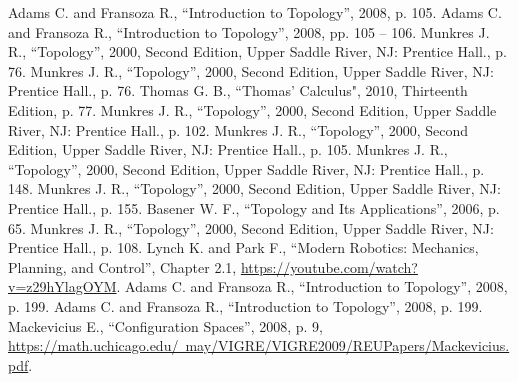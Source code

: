 \documentclass[12pt]{article}
\theoremstyle{definition}
\begin{document}
\begin{center}
\begin{thebibliography}{00}
     Adams C. and Fransoza R., ``Introduction to Topology'', 2008, p. 105.
     Adams C. and Fransoza R., ``Introduction to Topology'', 2008, pp. 105 -- 106.
     Munkres J. R., ``Topology'', 2000, Second Edition, Upper Saddle River, NJ: Prentice Hall., p. 76.
     Munkres J. R., ``Topology'', 2000, Second Edition, Upper Saddle River, NJ: Prentice Hall., p. 76.
     Thomas G. B., ``Thomas' Calculus", 2010, Thirteenth Edition, p. 77.
     Munkres J. R., ``Topology'', 2000, Second Edition, Upper Saddle River, NJ: Prentice Hall., p. 102.
     Munkres J. R., ``Topology'', 2000, Second Edition, Upper Saddle River, NJ: Prentice Hall., p. 105.
     Munkres J. R., ``Topology'', 2000, Second Edition, Upper Saddle River, NJ: Prentice Hall., p. 148.
     Munkres J. R., ``Topology'', 2000, Second Edition, Upper Saddle River, NJ: Prentice Hall., p. 155.
     Basener W. F., ``Topology and Its Applications'', 2006, p. 65.
     Munkres J. R., ``Topology'', 2000, Second Edition, Upper Saddle River, NJ: Prentice Hall., p. 108.
     Lynch K. and Park F., ``Modern Robotics: Mechanics, Planning, and Control'', Chapter 2.1, \href{https://youtube.com/watch?v=z29hYlagOYM}{https://youtube.com/watch?v=z29hYlagOYM}.
     Adams C. and Fransoza R., ``Introduction to Topology'', 2008, p. 199.
     Adams C. and Fransoza R., ``Introduction to Topology'', 2008, p. 199.
     Mackevicius E., ``Configuration Spaces'', 2008, p. 9,\\\href{https://math.uchicago.edu/~may/VIGRE/VIGRE2009/REUPapers/Mackevicius.pdf}{https://math.uchicago.edu/~may/VIGRE/VIGRE2009/REUPapers/Mackevicius.pdf}.
\end{thebibliography}
\end{center}
\end{document}
